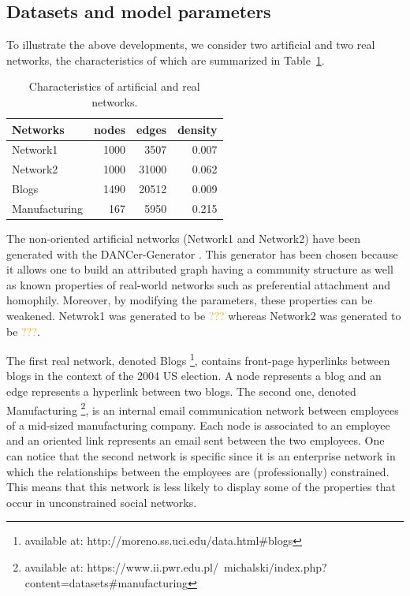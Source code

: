 \subsection{Datasets and model parameters}

To illustrate the above developments, we consider two artificial and two real networks, the characteristics of which are summarized in Table~\ref{table:networks_measures}.

\begin{table}[h] 
	\centering
	\caption{Characteristics of artificial and real networks.}
    \begin{tabular}{lrrr}
        \hline
        \textbf{Networks} &   nodes &   edges &   density \\
        \hline
        Network1 &    1000 &    3507 &     0.007 \\
        Network2 &    1000 &   31000 &     0.062 \\
        Blogs         &    1490 &   20512 &     0.009 \\
        Manufacturing &     167 &    5950 &     0.215 \\
    \hline
    \end{tabular}
	\label{table:networks_measures}
\end{table}

The non-oriented artificial networks (Network1 and Network2) have been generated with the DANCer-Generator \cite{largeron2015}. This generator has been chosen because it allows one to build an attributed graph having a community structure as well as known properties of real-world networks such as preferential attachment and homophily. Moreover, by modifying the parameters, these properties can be weakened. Netwrok1 was generated to be \textcolor{orange}{???} whereas Network2 was generated to be \textcolor{orange}{???}.

The first real network, denoted Blogs \footnote{available at: http://moreno.ss.uci.edu/data.html\#blogs}, contains front-page hyperlinks between blogs in the context of the 2004 US election. A node represents a blog and an edge represents a hyperlink between two blogs. The second one, denoted Manufacturing \footnote{available at: https://www.ii.pwr.edu.pl/~michalski/index.php?content=datasets\#manufacturing}, is an internal email communication network between employees of a mid-sized manufacturing company. Each node is associated to an employee and an oriented link represents an email sent between the two employees. One can notice that the second network is specific since it is an enterprise network in which the relationships between the employees are (professionally) constrained. This means that this network is less likely to display some of the properties that occur in unconstrained social networks.

